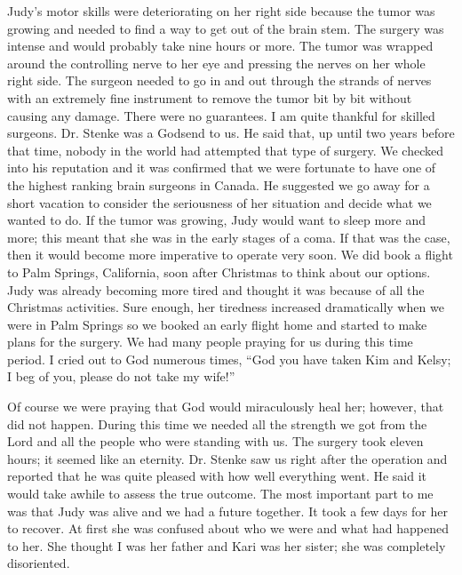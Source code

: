 \documentclass[oneside]{book}
\begin{document}
Judy’s motor skills were deteriorating on her right side because the tumor was growing and needed to find a way to get out of the brain stem. The surgery was intense and would probably take nine hours or more. The tumor was wrapped around the controlling nerve to her eye and pressing the nerves on her whole right side. The surgeon needed to go in and out through the strands of nerves with an extremely fine instrument to remove the tumor bit by bit without causing any damage. There were no guarantees. I am quite thankful for skilled surgeons. Dr. Stenke was a Godsend to us. He said that, up until two years before that time, nobody in the world had attempted that type of surgery. We checked into his reputation and it was confirmed that we were fortunate to have one of the highest ranking brain surgeons in Canada. He suggested we go away for a short vacation to consider the seriousness of her situation and decide what we wanted to do. If the tumor was growing, Judy would want to sleep more and more; this meant that she was in the early stages of a coma. If that was the case, then it would become more imperative to operate very soon. We did book a flight to Palm Springs, California, soon after Christmas to think about our options. Judy was already becoming more tired and thought it was because of all the Christmas activities. Sure enough, her tiredness increased dramatically when we were in Palm Springs so we booked an early flight home and started to make plans for the surgery. We had many people praying for us during this time period. I cried out to God numerous times, “God you have taken Kim and Kelsy; I beg of you, please do not take my wife!”

Of course we were praying that God would miraculously heal her; however, that did not happen. During this time we needed all the strength we got from the Lord and all the people who were standing with us. The surgery took eleven hours; it seemed like an eternity. Dr. Stenke saw us right after the operation and reported that he was quite pleased with how well everything went. He said it would take awhile to assess the true outcome. The most important part to me was that Judy was alive and we had a future together. It took a few days for her to recover. At first she was confused about who we were and what had happened to her. She thought I was her father and Kari was her sister; she was completely disoriented. 
\end{document}
